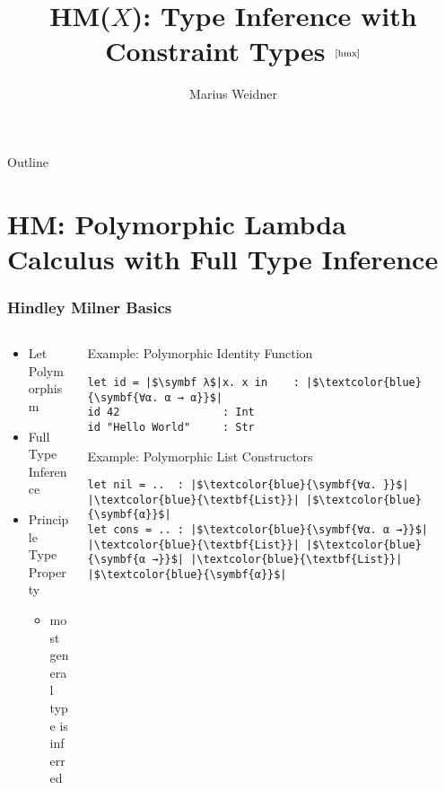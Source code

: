 \documentclass[aspectratio=169]{beamer}
\title{HM($X$): Type Inference with Constraint Types $^{\text{\cite{hmx}}}$}
\institute[Uni Freiburg]{Chair of Programming Languages, University of
  Freiburg}
\author{Marius Weidner}
\begin{document}
\begin{frame}
  \titlepage
\end{frame}

\begin{frame}{Outline}
  \tableofcontents
\end{frame}

\section{HM: Polymorphic Lambda Calculus with Full Type Inference}

\begin{frame}[fragile]
  \frametitle{Hindley Milner Basics}
  \begin{columns}
    \begin{column}{0.38\textwidth}
      \begin{center}
        \begin{itemize}
          \item Let Polymorphism
          \item Full Type Inference
          \item Principle Type Property
                \begin{itemize}
                  \item most general type is inferred
                \end{itemize}
        \end{itemize}
      \end{center}
    \end{column}
    \begin{column}{0.6\textwidth}
      \begin{center}
        \begin{block}{Example: Polymorphic Identity Function}
          \begin{verbatim}
let id = |$\symbf λ$|x. x in    : |$\textcolor{blue}{\symbf{∀α. α → α}}$| 
id 42                : Int
id "Hello World"     : Str
          \end{verbatim}
        \end{block}
      \end{center}
      \begin{center}
        \begin{block}{Example: Polymorphic List Constructors}
          \begin{verbatim}
let nil = ..  : |$\textcolor{blue}{\symbf{∀α. }}$| |\textcolor{blue}{\textbf{List}}| |$\textcolor{blue}{\symbf{α}}$| 
let cons = .. : |$\textcolor{blue}{\symbf{∀α. α →}}$| |\textcolor{blue}{\textbf{List}}| |$\textcolor{blue}{\symbf{α →}}$| |\textcolor{blue}{\textbf{List}}| |$\textcolor{blue}{\symbf{α}}$| 
          \end{verbatim}
        \end{block}
      \end{center}
    \end{column}
  \end{columns}
\end{frame}
\end{document}
